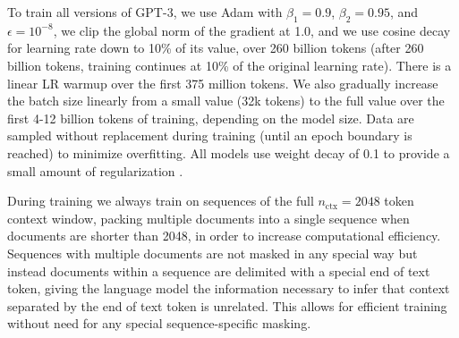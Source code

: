 To train all versions of GPT-3, we use Adam with $\beta_1=0.9$, $\beta_2=0.95$, and $\epsilon=10^{-8}$, we clip the global norm of the gradient at 1.0, and we use cosine decay for learning rate down to 10\% of its value, over 260 billion tokens (after 260 billion tokens, training continues at 10\% of the original learning rate).  There is a linear LR warmup over the first 375 million tokens.  We also gradually increase the batch size linearly from a small value (32k tokens) to the full value over the first 4-12 billion tokens of training, depending on the model size.  Data are sampled without replacement during training (until an epoch boundary is reached) to minimize overfitting. All models use weight decay of 0.1 to provide a small amount of regularization \cite{loshchilov2017decoupled}.

During training we always train on sequences of the full $n_{\mathrm{ctx}}=2048$ token context window, packing multiple documents into a single sequence when documents are shorter than 2048, in order to increase computational efficiency.  Sequences with multiple documents are not masked in any special way but instead documents within a sequence are delimited with a special end of text token, giving the language model the information necessary to infer that context separated by the end of text token is unrelated.  This allows for efficient training without need for any special sequence-specific masking.
